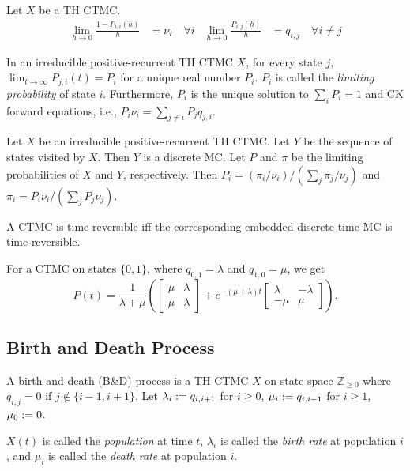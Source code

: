 \documentclass[a4paper, 12pt, fleqn]{article}
\begin{document}
\begin{lemma}
Let $X$ be a TH CTMC.
\begin{align*}
\lim_{h \to 0} \frac{1-P_{i,i}(h)}{h} &= \nu_i\quad\forall i
& \lim_{h \to 0} \frac{P_{i,j}(h)}{h} &= q_{i,j}\quad\forall i \neq j
\end{align*}
\end{lemma}

\begin{lemma}
\label{thm:ctmc:limprob}
In an irreducible positive-recurrent TH CTMC $X$, for every state $j$,
$\lim_{t \to \infty} P_{j,i}(t) = P_i$ for a unique real number $P_i$.
$P_i$ is called the \emph{limiting probability} of state $i$.
Furthermore, $P_i$ is the unique solution to $\sum_i P_i = 1$ and CK forward equations,
i.e., $P_i\nu_i = \sum_{j \neq i} P_jq_{j,i}$.
\end{lemma}

\begin{lemma}
Let $X$ be an irreducible positive-recurrent TH CTMC. Let $Y$ be the sequence of states visited by $X$.
Then $Y$ is a discrete MC. Let $P$ and $\pi$ be the limiting probabilities of $X$ and $Y$, respectively.
Then $P_i = (\pi_i/\nu_i)/(\sum_j \pi_j/\nu_j)$ and $\pi_i = P_i\nu_i/(\sum_j P_j\nu_j)$.
\end{lemma}

\begin{definition}
A CTMC is time-reversible iff the corresponding embedded discrete-time MC is time-reversible.
\end{definition}

\begin{lemma}[2-state]
For a CTMC on states $\{0, 1\}$, where $q_{0,1} = \lambda$ and $q_{1,0} = \mu$, we get
\[ P(t) = \frac{1}{\lambda + \mu}\left(
\begin{bmatrix}\mu & \lambda \\ \mu & \lambda\end{bmatrix}
+ e^{-(\mu+\lambda)t}\begin{bmatrix}\lambda & -\lambda \\ -\mu & \mu\end{bmatrix}
\right). \]
\end{lemma}

\subsection{Birth and Death Process}

\begin{definition}
A birth-and-death (B\&D) process is a TH CTMC $X$ on state space $\mathbb{Z}_{\ge 0}$ where
$q_{i,j} = 0$ if $j \not\in \{i-1, i+1\}$. Let $\lambda_i := q_{i,i+1}$ for $i \ge 0$,
$\mu_i := q_{i,i-1}$ for $i \ge 1$, $\mu_0 := 0$.

$X(t)$ is called the \emph{population} at time $t$,
$\lambda_i$ is called the \emph{birth rate} at population $i$,
and $\mu_i$ is called the \emph{death rate} at population $i$.
\end{definition}
\end{document}

